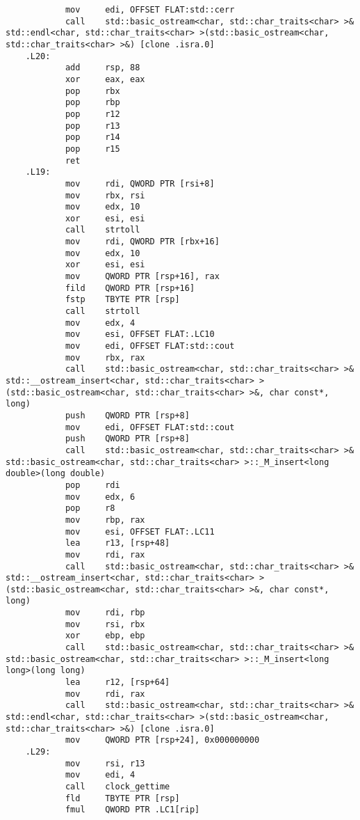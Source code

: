 \documentclass[12pt,a4paper]{article}
\numberwithin{subsection}{section}
\begin{document}
\begin{lstlisting}
            mov     edi, OFFSET FLAT:std::cerr
            call    std::basic_ostream<char, std::char_traits<char> >& std::endl<char, std::char_traits<char> >(std::basic_ostream<char, std::char_traits<char> >&) [clone .isra.0]
    .L20:
            add     rsp, 88
            xor     eax, eax
            pop     rbx
            pop     rbp
            pop     r12
            pop     r13
            pop     r14
            pop     r15
            ret
    .L19:
            mov     rdi, QWORD PTR [rsi+8]
            mov     rbx, rsi
            mov     edx, 10
            xor     esi, esi
            call    strtoll
            mov     rdi, QWORD PTR [rbx+16]
            mov     edx, 10
            xor     esi, esi
            mov     QWORD PTR [rsp+16], rax
            fild    QWORD PTR [rsp+16]
            fstp    TBYTE PTR [rsp]
            call    strtoll
            mov     edx, 4
            mov     esi, OFFSET FLAT:.LC10
            mov     edi, OFFSET FLAT:std::cout
            mov     rbx, rax
            call    std::basic_ostream<char, std::char_traits<char> >& std::__ostream_insert<char, std::char_traits<char> >(std::basic_ostream<char, std::char_traits<char> >&, char const*, long)
            push    QWORD PTR [rsp+8]
            mov     edi, OFFSET FLAT:std::cout
            push    QWORD PTR [rsp+8]
            call    std::basic_ostream<char, std::char_traits<char> >& std::basic_ostream<char, std::char_traits<char> >::_M_insert<long double>(long double)
            pop     rdi
            mov     edx, 6
            pop     r8
            mov     rbp, rax
            mov     esi, OFFSET FLAT:.LC11
            lea     r13, [rsp+48]
            mov     rdi, rax
            call    std::basic_ostream<char, std::char_traits<char> >& std::__ostream_insert<char, std::char_traits<char> >(std::basic_ostream<char, std::char_traits<char> >&, char const*, long)
            mov     rdi, rbp
            mov     rsi, rbx
            xor     ebp, ebp
            call    std::basic_ostream<char, std::char_traits<char> >& std::basic_ostream<char, std::char_traits<char> >::_M_insert<long long>(long long)
            lea     r12, [rsp+64]
            mov     rdi, rax
            call    std::basic_ostream<char, std::char_traits<char> >& std::endl<char, std::char_traits<char> >(std::basic_ostream<char, std::char_traits<char> >&) [clone .isra.0]
            mov     QWORD PTR [rsp+24], 0x000000000
    .L29:
            mov     rsi, r13
            mov     edi, 4
            call    clock_gettime
            fld     TBYTE PTR [rsp]
            fmul    QWORD PTR .LC1[rip]

\end{lstlisting}
\end{document}
